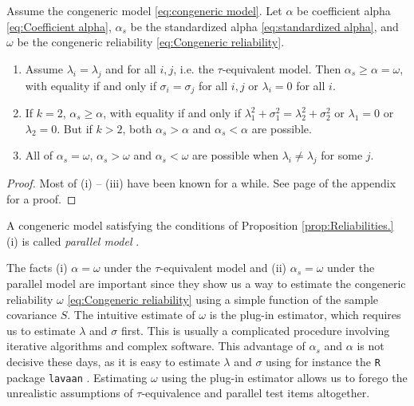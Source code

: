 \documentclass[twoside]{article}
\begin{document}
\begin{prop}
\label{prop:Reliabilities.}Assume the congeneric model \eqref{eq:congeneric model}. Let $\alpha$ be coefficient alpha \eqref{eq:Coefficient alpha}, $\alpha_{s}$ be the standardized alpha \eqref{eq:standardized alpha}, and  $\omega$ be the congeneric reliability \eqref{eq:Congeneric reliability}. 
\begin{enumerate}[label=(\roman*)]
\item Assume $\lambda_{i}=\lambda_{j}$ and for all $i,j$, i.e. the $\tau$-equivalent model. Then $\alpha_s \geq \alpha = \omega$, with equality if and only if $\sigma_{i}=\sigma_{j}$ for all $i,j$ or $\lambda_i = 0$ for all $i$.
\item If $k=2$, $\alpha_s\geq\alpha$, with equality if and only if $\lambda_{1}^{2}+\sigma_{1}^{2}=\lambda_{2}^{2}+\sigma_{2}^{2}$ or $\lambda_1 = 0$ or $\lambda_2 = 0$. But if $k>2$, both $\alpha_s>\alpha$
and $\alpha_s<\alpha$ are possible.
\item All of $\alpha_{s}=\omega$, $\alpha_{s}>\omega$ and $\alpha_{s}<\omega$
are possible when $\lambda_{i}\neq\lambda_{j}$ for some $j$.
\end{enumerate}
\end{prop}
\begin{proof}
Most of (i) -- (iii) have been known for a while. See page \pageref{proof:Reliabilities.} of the appendix for a proof.
\end{proof}

A congeneric model satisfying the conditions of Proposition \ref{prop:Reliabilities.} (i) is called \emph{parallel model} \citep[][section 2.13]{Lord1968-ax}. 

The facts (i) $\alpha = \omega$ under the $\tau$-equivalent model and (ii) $\alpha_s = \omega$ under the parallel model are important since they show us a way to estimate the congeneric reliability $\omega$ \eqref{eq:Congeneric reliability} using a simple function of the sample covariance $S$. The intuitive estimate of $\omega$ is the plug-in estimator, which requires us to estimate $\lambda$ and $\sigma$ first. This is usually a complicated procedure involving iterative algorithms and complex software. This advantage of $\alpha_s$ and $\alpha$ is not decisive these days, as it is easy to estimate $\lambda$ and $\sigma$ using for instance the \texttt{R} \citep{Team2013-tt} package \texttt{lavaan} \citep{Rosseel2012-yg}. Estimating $\omega$ using the plug-in estimator allows us to forego the unrealistic assumptions of $\tau$-equivalence and parallel test items altogether.
\end{document}
